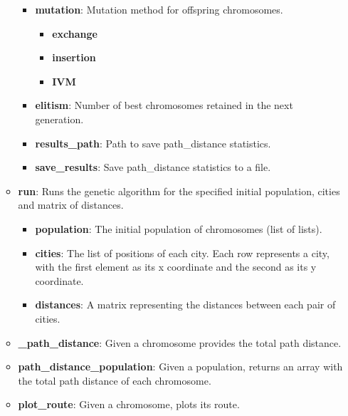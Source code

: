 \documentclass[11pt]{article}
\begin{document}
\begin{itemize}
\begin{itemize}
\begin{itemize}
            \item \textbf{mutation}: Mutation method for offspring chromosomes.
                \begin{itemize}
                    \item \textbf{exchange}
                    \item \textbf{insertion}
                    \item \textbf{IVM}
                \end{itemize}
            \item \textbf{elitism}: Number of best chromosomes retained in the next generation.
            \item \textbf{results\_path}: Path to save path\_distance statistics.
            \item \textbf{save\_results}: Save path\_distance statistics to a file.
        \end{itemize}
    \item \textbf{run}: Runs the genetic algorithm for the specified initial population, cities and matrix of distances.
        \begin{itemize}
            \item \textbf{population}: The initial population of chromosomes (list of lists).
            \item \textbf{cities}: The list of positions of each city. Each row represents a city, with the first element as its x coordinate and the second as its y coordinate.
            \item \textbf{distances}: A matrix representing the distances between each pair of cities.
        \end{itemize}
    \item \textbf{\_path\_distance}: Given a chromosome provides the total path distance.
    \item \textbf{path\_distance\_population}: Given a population, returns an array with the total path distance of each chromosome.
    \item \textbf{plot\_route}: Given a chromosome, plots its route.
\end{itemize}


\end{itemize}
\end{document}
